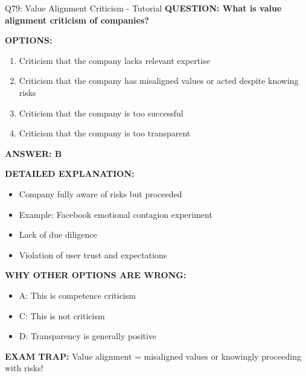\documentclass[8pt]{beamer}
\begin{document}
	\begin{frame}{Q79: Value Alignment Criticism - Tutorial}
		\fontsize{6.5}{7.5}\selectfont
		\textbf{QUESTION: What is value alignment criticism of companies?}
		
		\vspace{0.1cm}
		\textbf{OPTIONS:}
		\begin{enumerate}
			\item Criticism that the company lacks relevant expertise
			\item Criticism that the company has misaligned values or acted despite knowing risks
			\item Criticism that the company is too successful
			\item Criticism that the company is too transparent
		\end{enumerate}
		
		\vspace{0.1cm}
		\textcolor{myblue}{\textbf{ANSWER: B}}
		
		\vspace{0.1cm}
		\textbf{DETAILED EXPLANATION:}
		\begin{itemize}
			\item Company fully aware of risks but proceeded
			\item Example: Facebook emotional contagion experiment
			\item Lack of due diligence
			\item Violation of user trust and expectations
		\end{itemize}
		
		\vspace{0.1cm}
		\textcolor{myred}{\textbf{WHY OTHER OPTIONS ARE WRONG:}}
		\begin{itemize}
			\item \textcolor{myred}{A:} This is competence criticism
			\item \textcolor{myred}{C:} This is not criticism
			\item \textcolor{myred}{D:} Transparency is generally positive
		\end{itemize}
		
		\textcolor{myred}{\textbf{EXAM TRAP:}} Value alignment = \textcolor{myblue}{misaligned values or knowingly proceeding with risks}!
	\end{frame}
	
\end{document}
